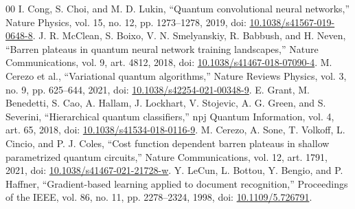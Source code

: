 \documentclass[conference]{IEEEtran}
\begin{document}
\begin{thebibliography}{00}
 I. Cong, S. Choi, and M. D. Lukin, ``Quantum convolutional neural networks,'' Nature Physics, vol. 15, no. 12, pp. 1273--1278, 2019, doi: \href{https://doi.org/10.1038/s41567-019-0648-8}{10.1038/s41567-019-0648-8}.
 J. R. McClean, S. Boixo, V. N. Smelyanskiy, R. Babbush, and H. Neven, ``Barren plateaus in quantum neural network training landscapes,'' Nature Communications, vol. 9, art. 4812, 2018, doi: \href{https://doi.org/10.1038/s41467-018-07090-4}{10.1038/s41467-018-07090-4}.
 M. Cerezo et al., ``Variational quantum algorithms,'' Nature Reviews Physics, vol. 3, no. 9, pp. 625--644, 2021, doi: \href{https://doi.org/10.1038/s42254-021-00348-9}{10.1038/s42254-021-00348-9}.
 E. Grant, M. Benedetti, S. Cao, A. Hallam, J. Lockhart, V. Stojevic, A. G. Green, and S. Severini, ``Hierarchical quantum classifiers,'' npj Quantum Information, vol. 4, art. 65, 2018, doi: \href{https://doi.org/10.1038/s41534-018-0116-9}{10.1038/s41534-018-0116-9}.
 M. Cerezo, A. Sone, T. Volkoff, L. Cincio, and P. J. Coles, ``Cost function dependent barren plateaus in shallow parametrized quantum circuits,'' Nature Communications, vol. 12, art. 1791, 2021, doi: \href{https://doi.org/10.1038/s41467-021-21728-w}{10.1038/s41467-021-21728-w}.
 Y. LeCun, L. Bottou, Y. Bengio, and P. Haffner, ``Gradient-based learning applied to document recognition,'' Proceedings of the IEEE, vol. 86, no. 11, pp. 2278--2324, 1998, doi: \href{https://doi.org/10.1109/5.726791}{10.1109/5.726791}.
\end{thebibliography}
\end{document}
